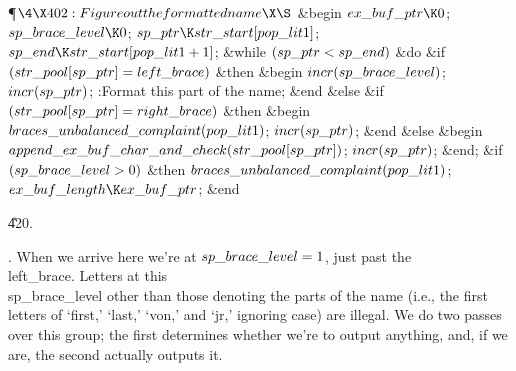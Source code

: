 \Y\P$\4\X402:Figure out the formatted name\X\S$\6
\&{begin} $\\{ex\_buf\_ptr}\K0$;\5
$\\{sp\_brace\_level}\K0$;\5
$\\{sp\_ptr}\K\\{str\_start}[\\{pop\_lit1}]$;\5
$\\{sp\_end}\K\\{str\_start}[\\{pop\_lit1}+1]$;\6
\&{while} $(\\{sp\_ptr}<\\{sp\_end})$ \1\&{do}\6
\&{if} $(\\{str\_pool}[\\{sp\_ptr}]=\\{left\_brace})$ \1\&{then}\6
\&{begin} $\\{incr}(\\{sp\_brace\_level})$;\5
$\\{incr}(\\{sp\_ptr})$;\5
:Format this part of the name\X;\6
\&{end}\6
\4\&{else} \&{if} $(\\{str\_pool}[\\{sp\_ptr}]=\\{right\_brace})$ \1\&{then}\6
\&{begin} $\\{braces\_unbalanced\_complaint}(\\{pop\_lit1})$;\5
$\\{incr}(\\{sp\_ptr})$;\6
\&{end}\6
\4\&{else} \&{begin} $\\{append\_ex\_buf\_char\_and\_check}(\\{str\_pool}[%
\\{sp\_ptr}])$;\5
$\\{incr}(\\{sp\_ptr})$;\6
\&{end};\2\2\2\6
\&{if} $(\\{sp\_brace\_level}>0)$ \1\&{then}\5
$\\{braces\_unbalanced\_complaint}(\\{pop\_lit1})$;\2\6
$\\{ex\_buf\_length}\K\\{ex\_buf\_ptr}$;\6
\&{end}\par
\U420.\fi

.
When we arrive here we're at $\\{sp\_brace\_level}=1$, just past the
\\{left\_brace}.  Letters at this \\{sp\_brace\_level} other than those
denoting the parts of the name (i.e., the first letters of `first,'
`last,' `von,' and `jr,' ignoring case) are illegal.  We do two passes
over this group; the first determines whether we're to output
anything, and, if we are, the second actually outputs it.

